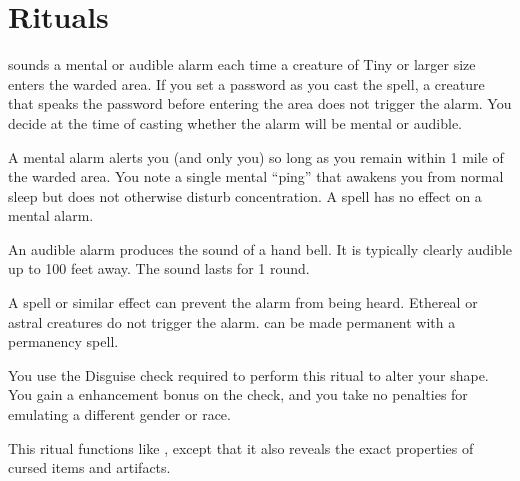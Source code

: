 \section{Rituals}

\spellrng{\rngclose}
\begin{spelleffect}
 sounds a mental or audible alarm each time a creature of Tiny or larger size enters the warded area. If you set a password as you cast the spell, a creature that speaks the password before entering the area does not trigger the alarm. You decide at the time of casting whether the alarm will be mental or audible.
\par {} A mental alarm alerts you (and only you) so long as you remain within 1 mile of the warded area. You note a single mental ``ping'' that awakens you from normal sleep but does not otherwise disturb concentration. A  spell has no effect on a mental alarm.
\par {} An audible alarm produces the sound of a hand bell. It is typically clearly audible up to 100 feet away. The sound lasts for 1 round. 
\end{spelleffect}
\begin{spellnotes}
A  spell or similar effect can prevent the alarm from being heard. Ethereal or astral creatures do not trigger the alarm.  can be made permanent with a permanency spell.
\end{spellnotes}

\spelldur{\durlong}
\begin{spelleffect}
    You use the Disguise check required to perform this ritual to alter your shape. You gain a  enhancement bonus on the check, and you take no penalties for emulating a different gender or race.
\end{spelleffect}

\begin{spelleffect}
    This ritual functions like , except that it also reveals the exact properties of cursed items and artifacts.
\end{spelleffect}

